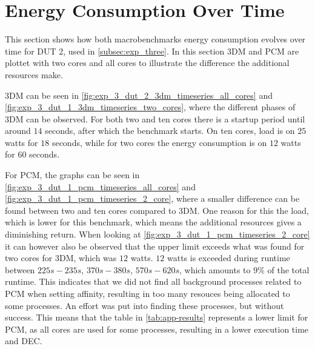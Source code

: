 \section{Energy Consumption Over Time}\label{app:timeseries}

This section shows how both macrobenchmarks energy consumption evolves over time for DUT 2, used in \cref{subsec:exp_three}. In this section 3DM and PCM are plottet with two cores and all cores to illustrate the difference the additional resources make. 

3DM can be seen in \cref{fig:exp_3_dut_2_3dm_timeseries_all_cores} and \cref{fig:exp_3_dut_1_3dm_timeseries_two_cores}, where the different phases of 3DM can be observed. For both two and ten cores there is a startup period until around $14$ seconds, after which the benchmark starts. On ten cores, load is on $25$ watts for $18$ seconds, while for two cores the energy consumption is on $12$ watts for $60$ seconds. 




For PCM, the graphs can be seen in \cref{fig:exp_3_dut_1_pcm_timeseries_all_cores} and \cref{fig:exp_3_dut_1_pcm_timeseries_2_core}, where a smaller difference can be found between two and ten cores compared to 3DM. One reason for this the load, which is lower for this benchmark, which means the additional resources gives a diminishing return. When looking at \cref{fig:exp_3_dut_1_pcm_timeseries_2_core} it can however also be observed that the upper limit exceeds what was found for two cores for 3DM, which was $12$ watts. $12$ watts is exceeded during runtime between $225s-235s$, $370s-380s$, $570s-620s$, which amounts to $9\%$ of the total runtime. This indicates that we did not find all background processes related to PCM when setting affinity, resulting in too many resouces being allocated to some processes. An effort was put into finding these processes, but without success. This means that the table in \cref{tab:app-results} represents a lower limit for PCM, as all cores are used for some processes, resulting in a lower execution time and DEC.


